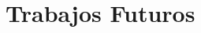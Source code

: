 \documentclass[aspectratio=169, handout]{beamer}
\begin{document}
\section{Trabajos Futuros}


%
%

\end{document}
